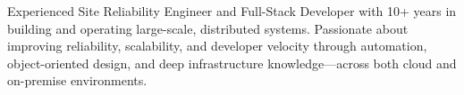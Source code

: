 \documentclass[9pt]{developercv} %
\begin{document}
\vspace{0.5cm}



\begin{minipage}[t]{0.4\textwidth} %
	\vspace{-\baselineskip} %
    Experienced Site Reliability Engineer and Full-Stack Developer with 10+ years in building and operating large-scale, distributed systems. Passionate about improving reliability, scalability, and developer velocity through automation, object-oriented design, and deep infrastructure knowledge—across both cloud and on-premise environments.
\newline\newline
\end{minipage}
\hfill %
\begin{minipage}[t]{0.5\textwidth} %
	\vspace{-\baselineskip} %
		\begin{barchart}{5.5}
\end{barchart}
\end{minipage}


\end{document}
